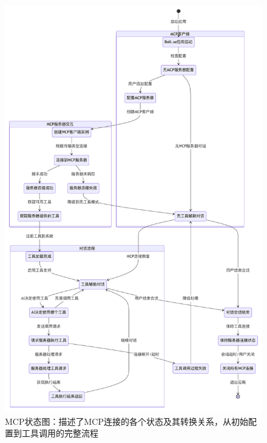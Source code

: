 \begin{figure}[htbp]
  \centering
  \includegraphics[width=\textwidth]{figures/mcp_state.pdf}
  \caption{MCP状态图：描述了MCP连接的各个状态及其转换关系，从初始配置到工具调用的完整流程}
  \label{fig:mcp_state}
\end{figure}

    
    
    
